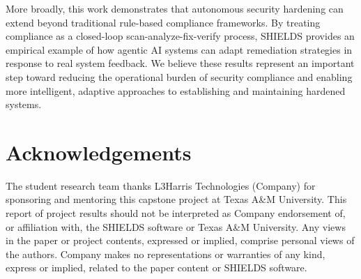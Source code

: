 \documentclass[pdflatex,sn-mathphys-num]{sn-jnl}%
\begin{document}
More broadly, this work demonstrates that autonomous security hardening can extend beyond traditional rule-based compliance frameworks. By treating compliance as a closed-loop scan-analyze-fix-verify process, SHIELDS provides an empirical example of how agentic AI systems can adapt remediation strategies in response to real system feedback. We believe these results represent an important step toward reducing the operational burden of security compliance and enabling more intelligent, adaptive approaches to establishing and maintaining hardened systems.



\section{Acknowledgements}\label{sec:acknowledgements}

The student research team thanks L3Harris Technologies (Company) for sponsoring and mentoring this capstone project at Texas A\&M University. This report of project results should not be interpreted as Company endorsement of, or affiliation with, the SHIELDS software or Texas A\&M University. Any views in the paper or project contents, expressed or implied, comprise personal views of the authors. Company makes no representations or warranties of any kind, express or implied, related to the paper content or SHIELDS software.





\backmatter
\end{document}
